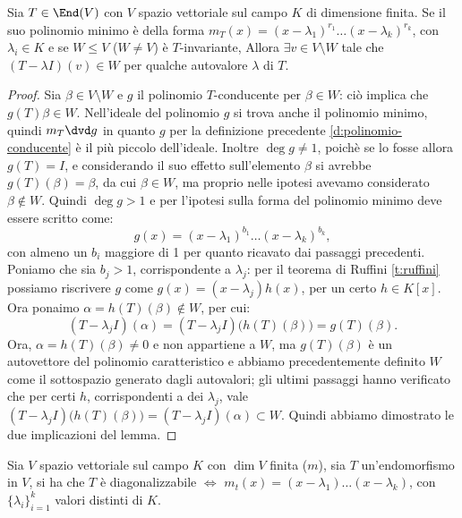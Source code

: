 \begin{lemma}\label{l:invarianza-autovalori}
	Sia $T\in \End(V)$ con $V$ spazio vettoriale sul campo $K$ di dimensione finita.
	Se il suo polinomio minimo è della forma $m_T(x) = (x-\lambda_1)^{r_1}\dots(x-\lambda_k)^{r_k}$, con $\lambda_i\in K$ e se $W \leq V$ ($W\ne V$) è $T$-invariante, Allora $\exists v\in V\setminus W$ tale che $(T-\lambda I)(v)\in W$ per qualche autovalore $\lambda$ di $T$.
\end{lemma}
\begin{proof}
	Sia $\beta\in V\setminus W$ e $g$ il polinomio $T$-conducente per $\beta\in W$: ciò implica che $g(T)\beta\in W$. %
	 Nell'ideale del polinomio $g$ si trova anche il polinomio minimo, quindi $m_T\dvd g$ in quanto $g$ per la definizione precedente \ref{d:polinomio-conducente} è il più piccolo dell'ideale. %
	 Inoltre $\deg g\ne 1$, poichè se lo fosse allora $g(T) = I$, e considerando il suo effetto sull'elemento $\beta$ si avrebbe $g(T)(\beta) = \beta$, da cui $\beta\in W$, ma proprio nelle ipotesi avevamo considerato $\beta\notin W$.
	 Quindi $\deg g > 1$ e per l'ipotesi sulla forma del polinomio minimo deve essere scritto come:
	\begin{equation*}
		g(x) = (x-\lambda_1)^{b_1}\dots (x-\lambda_k)^{b_k},
	\end{equation*}
	con almeno un $b_i$ maggiore di 1 per quanto ricavato dai passaggi precedenti.
	Poniamo che sia $b_j > 1$, corrispondente a $\lambda_j$: per il teorema di Ruffini \ref{t:ruffini} possiamo riscrivere $g$ come $g(x) = (x-\lambda_j)h(x)$, per un certo $h\in K[x]$.
	Ora ponaimo $\alpha = h(T)(\beta)\notin W$, per cui:
	\begin{equation*}
		(T-\lambda_j I)(\alpha) = (T-\lambda_j I)\big(h(T)(\beta) \big) = g(T)(\beta).
	\end{equation*}
	Ora, $\alpha = h(T)(\beta) \neq 0$ e non appartiene a $W$, ma $g(T)(\beta)$ è un autovettore del polinomio caratteristico e abbiamo precedentemente definito $W$ come il sottospazio generato dagli autovalori; gli ultimi passaggi hanno verificato che per certi $h$, corrispondenti a dei $\lambda_j$, vale $(T-\lambda_j I)\big(h(T)(\beta) \big) = (T-\lambda_j I)(\alpha) \subset W$.
	Quindi abbiamo dimostrato le due implicazioni del lemma.
\end{proof}
\begin{teorema}
	Sia $V$ spazio vettoriale sul campo $K$ con $\dim V$ finita ($m$), sia $T$ un'endomorfismo in $V$, si ha che $T$ è diagonalizzabile $\iff$ $m_t(x) = (x-\lambda_1)\dots(x-\lambda_k)$, con $\{\lambda_i\}_{i=1}^k$ valori distinti di $K$.
\end{teorema}

